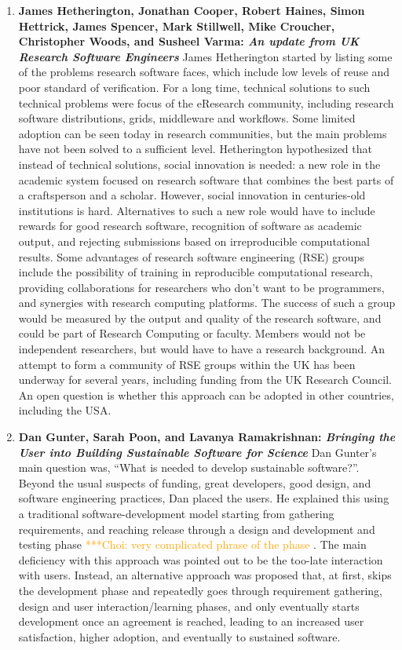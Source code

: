 \documentclass[11pt, oneside]{amsart}
\newcommand{\choinote}[1]{ {\textcolor{orange}    {***Choi: #1 }}}
\begin{document}
\begin{enumerate}
\item \textbf{James Hetherington, Jonathan Cooper, Robert Haines, Simon
Hettrick, James Spencer, Mark Stillwell, Mike Croucher, Christopher Woods, and
Susheel Varma: \textit{An update from UK Research Software Engineers}} James
Hetherington started by listing some of the problems research software faces,
which include low levels of reuse and poor standard of verification. For a long
time, technical solutions to such technical problems were focus of the eResearch
community, including research software distributions, grids, middleware and
workflows. Some limited adoption can be seen today in research communities, but
the main problems have not been solved to a sufficient level.  Hetherington
hypothesized that instead of technical solutions, social innovation is needed: a
new role in the academic system focused on research software that combines the
best parts of a craftsperson and a scholar. However, social innovation in
centuries-old institutions is hard. Alternatives to such a new role would have
to include rewards for good research software, recognition of software as
academic output, and rejecting submissions based on irreproducible computational
results. Some advantages of research software engineering (RSE) groups include
the possibility of training in reproducible computational research, providing
collaborations for researchers who don't want to be programmers, and
synergies with research computing platforms. The success of such a group would
be measured by the output and quality of the research software, and could be
part of Research Computing or faculty. Members would not be independent
researchers, but would have to have a research background. An attempt to form a
community of RSE groups within the UK has been underway for several years,
including funding from the UK Research Council. An open question is whether this
approach can be adopted in other countries, including the USA.

\item \textbf{Dan Gunter, Sarah Poon, and Lavanya Ramakrishnan: \textit{Bringing
the User into Building Sustainable Software for Science}} Dan Gunter's main
question was, ``What is needed to develop sustainable software?''. Beyond the
usual suspects of funding, great developers, good design, and software
engineering practices, Dan placed the users. He explained this using a
traditional software-development model starting from gathering requirements, and
reaching release through a design and development and testing phase \choinote{very complicated phrase of the phase}. The main
deficiency with this approach was pointed out to be the too-late
interaction with users. Instead, an alternative approach was proposed that, at
first, skips the development phase and repeatedly goes through requirement
gathering, design and user interaction/learning phases, and only eventually
starts development once an agreement is reached, leading to an increased user
satisfaction, higher adoption, and eventually to sustained software.


\end{enumerate}
\end{document}
